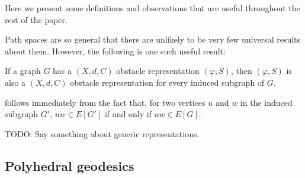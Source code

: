 \documentclass{patmorin}
\newcommand{\eps}{\epsilon}
\begin{document}
Here we present some definitions and observations that are useful
throughout the rest of the paper.  

Path spaces are so general that there are unlikely to be very few
universal results about them.  However, the following is one such
useful result:

\begin{obs}
   If a graph $G$ has a $(X,d,C)$ obstacle representation
   $(\varphi,S)$, then   $(\varphi, S)$ is also a $(X,d,C)$ obstacle
   representation for every induced subgraph of $G$.
\end{obs}

 follows immediately from the fact that, for two vertices
$u$ and $w$ in the induced subgraph $G'$, $uw\in E[G']$ if and only if
$uw\in E[G]$.

TODO: Say something about generic representations.


%
%
%

\subsection{Polyhedral geodesics}
\end{document}
